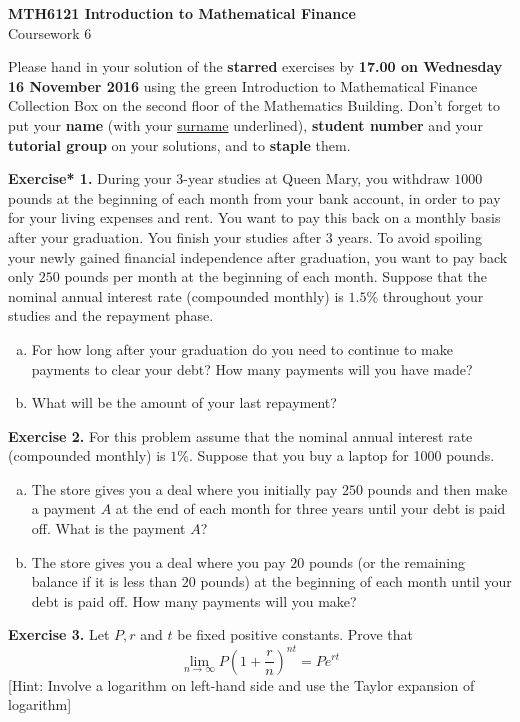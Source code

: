 \documentclass[11pt,a4paper]{report}
\begin{document}
    \begin{center}
        \LARGE\textbf{MTH6121 Introduction to Mathematical Finance}\\
        Coursework 6
    \end{center}
Please hand in your solution of the \textbf{starred} exercises by \textbf{17.00 on Wednesday 16 November 2016} using the green Introduction to Mathematical Finance Collection Box on the second floor of the Mathematics Building. Don’t forget to put your \textbf{name} (with your \underline{surname} underlined), \textbf{student number} and your \textbf{tutorial group} on your solutions, and to \textbf{staple} them.\par
\textbf{Exercise* 1.}
During your $3$-year studies at Queen Mary, you withdraw $1000$ pounds at the beginning of each month from your bank account, in order to pay for your living expenses and rent. You want to pay this back on a monthly basis after your graduation. You finish your studies after $3$ years. To avoid spoiling your newly gained financial independence after graduation, you want to pay back only $250$ pounds per month at the beginning of each month. Suppose that the nominal annual interest rate (compounded monthly) is $1.5\%$ throughout your studies and the repayment phase.
\begin{enumerate}[(a)]
    \item For how long after your graduation do you need to continue to make payments to clear your debt? How many payments will you have made?
    \item What will be the amount of your last repayment?
\end{enumerate}
%
\textbf{Exercise 2.} For this problem assume that the nominal annual interest rate (compounded monthly) is $1\%$. Suppose that you buy a laptop for 1000 pounds.
\begin{enumerate}[(a)]
    \item The store gives you a deal where you initially pay $250$ pounds and then make a payment $A$ at the end of each month for three years until your debt is paid off. What is the payment $A$?
    \item The store gives you a deal where you pay $20$ pounds (or the remaining balance if it is less than $20$ pounds) at the beginning of each month until your debt is paid off. How many payments will you make?
\end{enumerate}
%
\textbf{Exercise 3.} Let $P, r$ and $t$ be fixed positive constants. Prove that
$$\lim_{n\to \infty}P\left(1+\frac{r}{n}\right)^{nt}=Pe^{rt}$$
{[}Hint: Involve a logarithm on left-hand side and use the Taylor expansion of logarithm{]}
\end{document}
